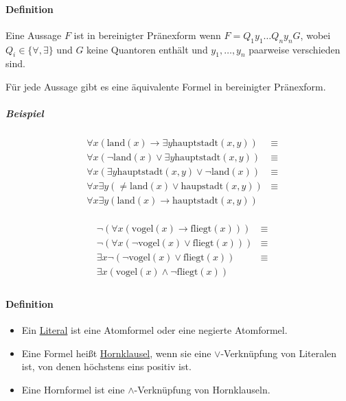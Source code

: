 \documentclass[a4paper]{scrartcl}
\begin{document}
\paragraph{Definition} Eine Aussage $F$ ist in bereinigter Pränexform wenn $F= Q_1 y_1 \dots Q_n y_n G$, wobei $Q_i \in \{ \forall , \exists \}$ und $G$ keine Quantoren enthält und $y_1,\dots,y_n$ paarweise verschieden sind.

Für jede Aussage gibt es eine äquivalente Formel in bereinigter Pränexform.

\subparagraph{Beispiel} \begin{align*}
&\forall x ( \text{land} (x) \rightarrow \exists y \text{hauptstadt} (x,y)) &\equiv \\
&\forall x (\neg \text{land}(x) \vee \exists y \text{hauptstadt} (x,y)) &\equiv \\
&\forall x (\exists y \text{hauptstadt}(x,y) \vee \neg \text{land} (x)) &\equiv\\
&\forall x \exists y (\neq \text{land}(x) \vee \text{haupstadt}(x,y) ) &\equiv\\
&\forall x \exists y (\text{land} (x) \rightarrow \text{hauptstadt} (x,y))\\
\end{align*}

\begin{align*}
&\neg (\forall x(\text{vogel}(x) \rightarrow \text{fliegt} (x) ) ) &\equiv \\
&\neg (\forall x(\neg\text{vogel}(x) \vee \text{fliegt} (x) )) &\equiv \\
&\exists x \neg (\neg \text{vogel} (x) \vee \text{fliegt} (x) ) &\equiv \\
&\exists x (\text{vogel} (x) \wedge \neg \text{fliegt} (x))\\
\end{align*}

\paragraph{Definition}
\begin{itemize}
\item Ein \underline{Literal} ist eine Atomformel oder eine negierte Atomformel.
\item Eine Formel heißt \underline{Hornklausel}, wenn sie eine $\vee$-Verknüpfung von Literalen ist, von denen höchstens eins positiv ist.
\item Eine Hornformel ist eine $\wedge$-Verknüpfung von Hornklauseln.
\end{itemize}
\end{document}

